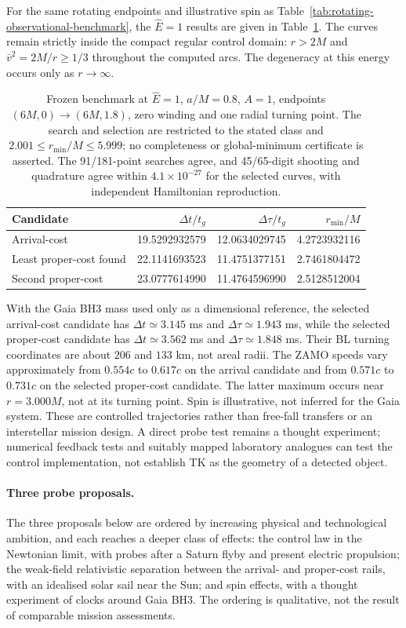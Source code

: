 \documentclass[12pt]{iopart}
\theoremstyle{plain}
\theoremstyle{definition}
\theoremstyle{remark}
\newcommand{\Ehat}{\hat E}
\begin{document}
For the same rotating endpoints and illustrative spin as
Table~\ref{tab:rotating-observational-benchmark}, the $\Ehat=1$ results
are given in Table~\ref{tab:obs-E1}. The curves remain strictly inside
the compact regular control domain: $r>2M$ and
$\bar v^2=2M/r\ge1/3$ throughout the computed arcs.
The degeneracy at this energy occurs only as $r\to\infty$.

\begin{table}[ht]
\centering\small
\begin{tabular}{lrrr}
\hline
Candidate & $\Delta t/t_g$ & $\Delta\tau/t_g$ & $r_{\min}/M$\\
\hline
Arrival-cost & 19.5292932579 & 12.0634029745 & 4.2723932116\\
Least proper-cost found & 22.1141693523 & 11.4751377151 & 2.7461804472\\
Second proper-cost & 23.0777614990 & 11.4764596990 & 2.5128512004\\
\hline
\end{tabular}
\caption{Frozen benchmark at $\Ehat=1$, $a/M=0.8$, $A=1$, endpoints
$(6M,0)\to(6M,1.8)$, zero winding and one radial turning point.
The search and selection are restricted to the stated class and
$2.001\le r_{\min}/M\le5.999$; no completeness or global-minimum
certificate is asserted. The 91/181-point searches agree, and
45/65-digit shooting and quadrature agree within $4.1\times10^{-27}$
for the selected curves, with independent Hamiltonian reproduction.}
\label{tab:obs-E1}
\end{table}

With the Gaia BH3 mass used only as a dimensional reference, the selected
arrival-cost candidate has $\Delta t\simeq3.145$ ms and
$\Delta\tau\simeq1.943$ ms, while the selected proper-cost candidate
has $\Delta t\simeq3.562$ ms and $\Delta\tau\simeq1.848$ ms.
Their BL turning coordinates are about $206$ and $133$ km, not areal radii.
The ZAMO speeds vary approximately from $0.554c$ to $0.617c$ on the
arrival candidate and from $0.571c$ to $0.731c$ on the selected proper-cost
candidate. The latter maximum occurs near $r=3.000M$, not at its turning
point. Spin is illustrative, not inferred for the Gaia system.
These are controlled trajectories rather than free-fall transfers or
an interstellar mission design. A direct probe test remains a thought
experiment; numerical feedback tests and suitably mapped laboratory
analogues can test the control implementation, not establish TK as
the geometry of a detected object.

\paragraph{Three probe proposals.}
The three proposals below are ordered by increasing physical and technological
ambition, and each reaches a deeper class of effects: the control law in the
Newtonian limit, with probes after a Saturn flyby and present electric propulsion;
the weak-field relativistic separation between the arrival- and proper-cost rails,
with an idealised solar sail near the Sun; and spin effects, with a thought experiment
of clocks around Gaia BH3. The ordering is qualitative, not the result of comparable
mission assessments.
\end{document}
